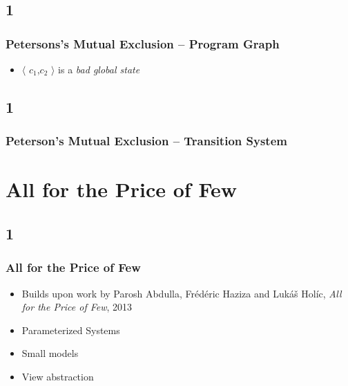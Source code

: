 \documentclass[handout]{beamer}
\begin{document}
\subsection*{1}
\begin{frame}
  \begin{example}
    \frametitle{Petersons's Mutual Exclusion -- Program Graph}
    \petersonone

    \petersontwo
  \end{example}
  \begin{itemize}
  \item
    $\langle$ $c_1$,$c_2$ $\rangle$ is a \emph{bad global state}
  \end{itemize}

\end{frame}

\subsection*{1}
\begin{frame}
  \frametitle{Peterson's Mutual Exclusion -- Transition System}
  \begin{example}
    \petersonboth
  \end{example}
\end{frame}


\section{All for the Price of Few}
\subsection*{1}
\begin{frame}
  \frametitle{All for the Price of Few}
  \begin{itemize}
  \item Builds upon work by Parosh Abdulla, Fr\'ed\'eric Haziza and Luk\'a\v{s} Hol\'ic, \emph{All for the Price of Few}, 2013
  \item Parameterized Systems
  \item Small models
  \item View abstraction
  \end{itemize}
\end{frame}
\end{document}
